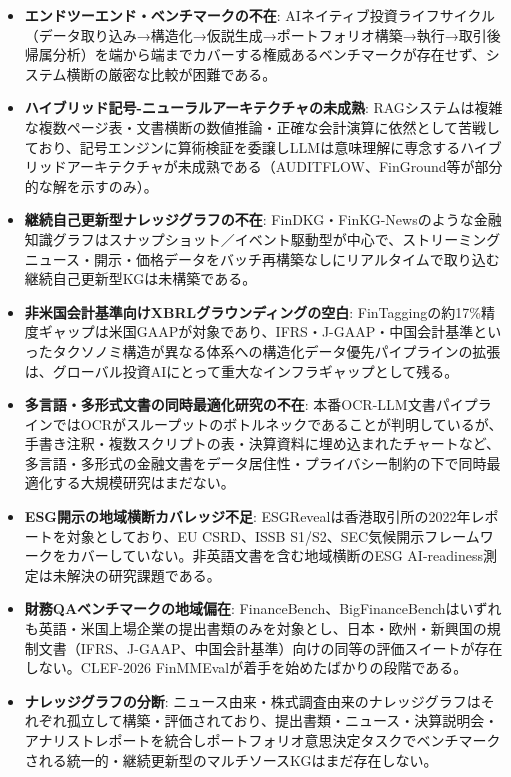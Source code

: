 \begin{itemize}
  \item \textbf{エンドツーエンド・ベンチマークの不在}: AIネイティブ投資ライフサイクル（データ取り込み→構造化→仮説生成→ポートフォリオ構築→執行→取引後帰属分析）を端から端までカバーする権威あるベンチマークが存在せず、システム横断の厳密な比較が困難である。
  \item \textbf{ハイブリッド記号-ニューラルアーキテクチャの未成熟}: RAGシステムは複雑な複数ページ表・文書横断の数値推論・正確な会計演算に依然として苦戦しており、記号エンジンに算術検証を委譲しLLMは意味理解に専念するハイブリッドアーキテクチャが未成熟である（AUDITFLOW\cite{auditflow2026}、FinGround\cite{finground2026}等が部分的な解を示すのみ）。
  \item \textbf{継続自己更新型ナレッジグラフの不在}: FinDKG\cite{findkg2024}・FinKG-Newsのような金融知識グラフはスナップショット／イベント駆動型が中心で、ストリーミングニュース・開示・価格データをバッチ再構築なしにリアルタイムで取り込む継続自己更新型KGは未構築である。
  \item \textbf{非米国会計基準向けXBRLグラウンディングの空白}: FinTagging\cite{fintagging2025}の約17\%精度ギャップは米国GAAPが対象であり、IFRS・J-GAAP・中国会計基準といったタクソノミ構造が異なる体系への構造化データ優先パイプラインの拡張は、グローバル投資AIにとって重大なインフラギャップとして残る。
  \item \textbf{多言語・多形式文書の同時最適化研究の不在}: 本番OCR-LLM文書パイプラインではOCRがスループットのボトルネックであることが判明しているが、手書き注釈・複数スクリプトの表・決算資料に埋め込まれたチャートなど、多言語・多形式の金融文書をデータ居住性・プライバシー制約の下で同時最適化する大規模研究はまだない。
  \item \textbf{ESG開示の地域横断カバレッジ不足}: ESGReveal\cite{esgreveal2023}は香港取引所の2022年レポートを対象としており、EU CSRD、ISSB S1/S2、SEC気候開示フレームワークをカバーしていない。非英語文書を含む地域横断のESG AI-readiness測定は未解決の研究課題である。
  \item \textbf{財務QAベンチマークの地域偏在}: FinanceBench\cite{financebench2023}、BigFinanceBench\cite{bigfinancebench2026}はいずれも英語・米国上場企業の提出書類のみを対象とし、日本・欧州・新興国の規制文書（IFRS、J-GAAP、中国会計基準）向けの同等の評価スイートが存在しない。CLEF-2026 FinMMEval\cite{finmmeval2026}が着手を始めたばかりの段階である。
  \item \textbf{ナレッジグラフの分断}: ニュース由来・株式調査由来のナレッジグラフはそれぞれ孤立して構築・評価されており、提出書類・ニュース・決算説明会・アナリストレポートを統合しポートフォリオ意思決定タスクでベンチマークされる統一的・継続更新型のマルチソースKGはまだ存在しない。
\end{itemize}

